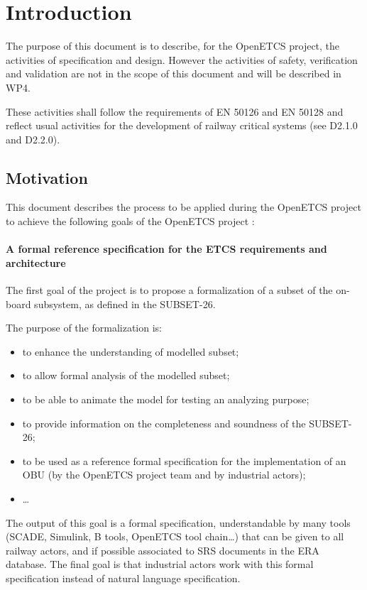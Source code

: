 
\section{Introduction}

The purpose of this document is to describe, for the OpenETCS project, the activities of specification and design. However the activities of safety, verification and validation are not in the scope of this document and will be described in WP4.

These activities shall follow the requirements of EN 50126 and EN 50128 and reflect usual activities for the development of railway critical systems (see D2.1.0  and D2.2.0).
\subsection{Motivation}

This document describes the process to  be applied  during the OpenETCS project to achieve the following goals of the OpenETCS project :

\paragraph{A formal reference specification for the ETCS requirements and architecture}
The first goal of the project is to propose a formalization of a subset of the on-board subsystem,
as defined in the SUBSET-26. 

The purpose of the formalization is:
\begin{itemize}
\item to enhance the understanding of modelled subset;
\item to allow formal analysis of the modelled subset;
\item to be able to animate the model for testing an analyzing purpose;
\item to provide information on the completeness and soundness of the SUBSET-26;
\item to be used as a reference formal specification for the implementation of an OBU 
(by the OpenETCS project team and by industrial actors);
\item \dots
\end{itemize}


The output of this goal is a formal specification, understandable by many tools (SCADE, 
Simulink, B tools, OpenETCS tool chain…) that can be given to all railway actors, and 
if possible associated to SRS documents in the ERA database.
The final goal is that industrial actors work with this formal specification instead of 
natural language specification.


